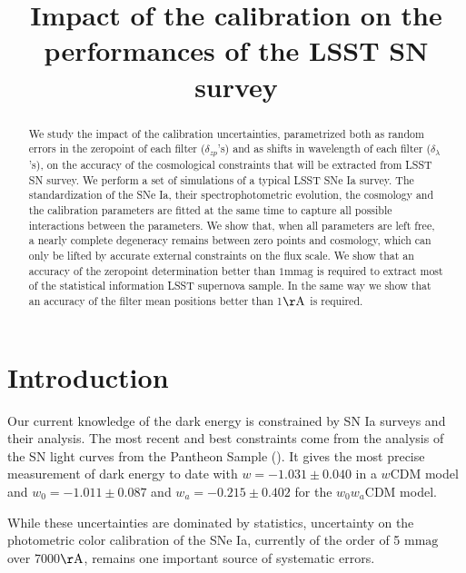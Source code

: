 \documentclass[\docopts]{\docclass}
\begin{document}
\title{ Impact of the calibration on the performances of the LSST SN survey }

\maketitlepre

\begin{abstract}
We study the impact of the calibration uncertainties, parametrized both as random errors in the zeropoint of each filter ($\delta_{zp}$'s) and as shifts in wavelength of each filter ($\delta_\lambda$'s), on the accuracy of the cosmological constraints that will be extracted from LSST SN survey.
We perform a set of simulations of a typical LSST SNe Ia survey.
The standardization of the SNe Ia, their spectrophotometric evolution, the cosmology and the calibration parameters are fitted at the same time to capture all possible interactions between the parameters.
We show that, when all parameters are left free, a nearly complete degeneracy remains between zero points and cosmology, which can only be lifted by accurate external constraints on the flux scale. We show that an accuracy of the zeropoint determination better than $1\mathrm{mmag}$ is required to extract most of the statistical information LSST supernova sample. In the same way we show that an accuracy of the filter mean positions better than 1$\mathrm{\AA}$ is required.
\end{abstract}


\maketitlepost

% 

\section{Introduction}
\label{sec:intro}

Our current knowledge of the dark energy is constrained by SN Ia surveys and their analysis. The most recent and best constraints come from the analysis of the SN light curves from the Pantheon Sample (\cite{1710.00845}).
It gives the most precise measurement of dark energy to date with $w = -1.031 \pm 0.040$ in a $w\mathrm{CDM}$ model and $w_0 = -1.011 \pm 0.087$ and $w_a = -0.215 \pm 0.402$ for the $w_0w_a\mathrm{CDM}$ model.

While these uncertainties are dominated by statistics, uncertainty on the photometric color calibration of the SNe Ia, currently of the order of 5 $\mathrm{mmag}$ over 7000$\mathrm{\AA}$, remains one important source of systematic errors.
\end{document}
